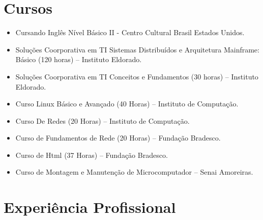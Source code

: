 \documentclass[a4paper]{article}
\begin{document}
\section{Cursos}
\begin{itemize}

	\item Cursando Inglês Nível Básico II - Centro Cultural Brasil Estados Unidos.
	\item Soluções Coorporativa em TI Sistemas Distribuídos e Arquitetura Mainframe: Básico (120 horas) – Instituto Eldorado.
	\item Soluções Coorporativa em TI Conceitos e Fundamentos (30 horas) – Instituto Eldorado.
	\item Curso Linux Básico e Avançado (40 Horas) – Instituto de Computação.
	\item Curso De Redes (20 Horas) – Instituto de Computação.	
	\item Curso de Fundamentos de Rede (20 Horas) – Fundação Bradesco.
	\item Curso de Html (37 Horas) – Fundação Bradesco.
	\item Curso de Montagem e Manutenção de Microcomputador – Senai Amoreiras.

\end{itemize}


\section{Experiência Profissional}
\end{document}
